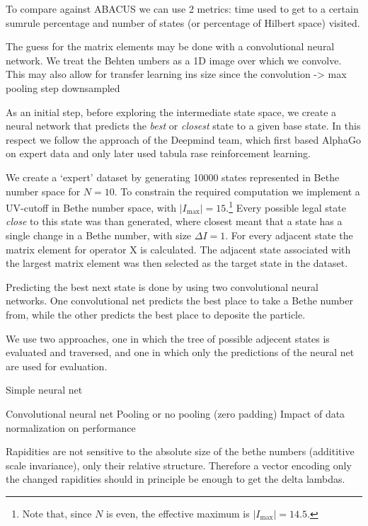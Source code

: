 \documentclass[11pt, a4paper]{report} %
\begin{document}
To compare against ABACUS we can use 2 metrics:
time used to get to a certain sumrule percentage and number of states (or percentage of Hilbert space) visited.

The guess for the matrix elements may be done with a convolutional neural network.
We treat the Behten umbers as a 1D image over which we convolve.
This may also allow for transfer learning ins size since the convolution -> max pooling step downsampled



As an initial step, before exploring the intermediate state space, we create a neural network that predicts the \textit{best} or \textit{closest} state to a given base state.
In this respect we follow the approach of the Deepmind team, which first based AlphaGo on expert data and only later used tabula rase reinforcement learning.

We create a `expert' dataset by generating 10000 states represented in Bethe number space for $N=10$.
To constrain the required computation we implement a UV-cutoff in Bethe number space, with $\lvert I_{\max}\rvert=15$.\footnote{Note that, since $N$ is even, the effective maximum is $\lvert I_{\max}\rvert=14.5$.}
Every possible legal state \textit{close} to this state was than generated, where closest meant that a state has a single change in a Bethe number, with size $\Delta I = 1$.
For every adjacent state the matrix element for operator X is calculated.
The adjacent state associated with the largest matrix element was then selected as the target state in the dataset.

Predicting the best next state is done by using two convolutional neural networks.
One convolutional net predicts the best place to take a Bethe number from, while the other predicts the best place to deposite the particle.


We use two approaches, one in which the tree of possible adjecent states is evaluated and traversed, and one in which only the predictions of the neural net are used for evaluation.

Simple neural net


Convolutional neural net
Pooling or no pooling (zero padding) 
Impact of data normalization on performance


Rapidities are not sensitive to the absolute size of the bethe numbers (addititive scale invariance), only their relative structure.
Therefore a vector encoding only the changed rapidities should in principle be enough to get the delta lambdas.
\end{document}
